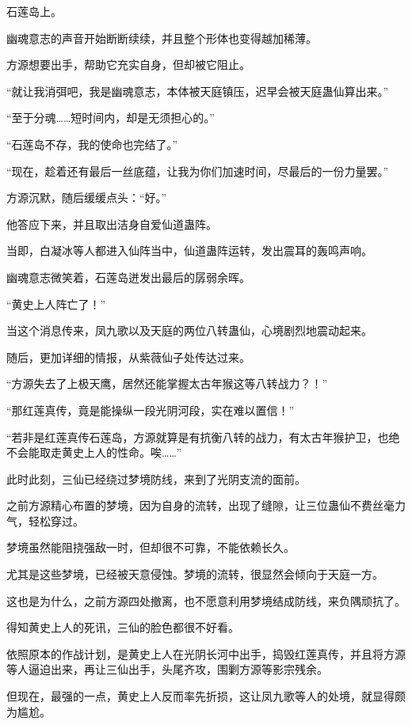 
\begin{this_body}

石莲岛上。

幽魂意志的声音开始断断续续，并且整个形体也变得越加稀薄。

方源想要出手，帮助它充实自身，但却被它阻止。

“就让我消弭吧，我是幽魂意志，本体被天庭镇压，迟早会被天庭蛊仙算出来。”

“至于分魂……短时间内，却是无须担心的。”

“石莲岛不存，我的使命也完结了。”

“现在，趁着还有最后一丝底蕴，让我为你们加速时间，尽最后的一份力量罢。”

方源沉默，随后缓缓点头：“好。”

他答应下来，并且取出洁身自爱仙道蛊阵。

当即，白凝冰等人都进入仙阵当中，仙道蛊阵运转，发出震耳的轰鸣声响。

幽魂意志微笑着，石莲岛迸发出最后的孱弱余晖。

“黄史上人阵亡了！”

当这个消息传来，凤九歌以及天庭的两位八转蛊仙，心境剧烈地震动起来。

随后，更加详细的情报，从紫薇仙子处传达过来。

“方源失去了上极天鹰，居然还能掌握太古年猴这等八转战力？！”

“那红莲真传，竟是能操纵一段光阴河段，实在难以置信！”

“若非是红莲真传石莲岛，方源就算是有抗衡八转的战力，有太古年猴护卫，也绝不会能取走黄史上人的性命。唉……”

此时此刻，三仙已经绕过梦境防线，来到了光阴支流的面前。

之前方源精心布置的梦境，因为自身的流转，出现了缝隙，让三位蛊仙不费丝毫力气，轻松穿过。

梦境虽然能阻挠强敌一时，但却很不可靠，不能依赖长久。

尤其是这些梦境，已经被天意侵蚀。梦境的流转，很显然会倾向于天庭一方。

这也是为什么，之前方源四处撤离，也不愿意利用梦境结成防线，来负隅顽抗了。

得知黄史上人的死讯，三仙的脸色都很不好看。

依照原本的作战计划，是黄史上人在光阴长河中出手，捣毁红莲真传，并且将方源等人逼迫出来，再让三仙出手，头尾齐攻，围剿方源等影宗残余。

但现在，最强的一点，黄史上人反而率先折损，这让凤九歌等人的处境，就显得颇为尴尬。


\end{this_body}
